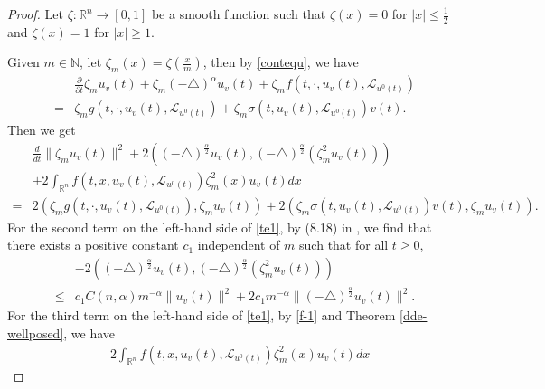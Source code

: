 \documentclass[11pt]{article}
\numberwithin{equation}{section}
\theoremstyle{plain}
\def\geq{\geqslant}
\def\leq{\leqslant}
\begin{document}
\begin{proof}
   Let $\zeta: \mathbb{R}^n \rightarrow [0,1]$ be a smooth function
   such that
   $\zeta(x)=0$ for $|x| \leq \frac{1}{2}$
   and $\zeta(x)=1$ for $|x| \geq 1$.

   Given $m \in \mathbb{N}$,
   let $\zeta_m(x) = \zeta( \frac{x}{m} )$,
   then by \eqref{contequ}, we have
\begin{align*}
        & \frac{\partial}{\partial t} \zeta_m u_v (t)
          + \zeta_m (-\triangle)^\alpha u_v (t)
          + \zeta_m f(t, \cdot, u_v(t), \mathcal{L}_{u^0(t)} )
            \nonumber \\
      = & \zeta_m g(t, \cdot, u_v(t), \mathcal{L}_{u^0(t)} )
          + \zeta_m \sigma(t, u_v (t), \mathcal{L}_{u^0(t)}) v(t).
\end{align*}
 Then  we get
\begin{align} \label{te1}
     & \frac{d}{dt} \| \zeta_m u_v(t) \|^2
        + 2
            \left( (-\triangle)^{\frac{\alpha}{2}} u_v(t),
                      (-\triangle)^{\frac{\alpha}{2}}
                                \left( \zeta_m^2 u_v(t) \right)
            \right)
             \nonumber \\
     & + 2 \int_{\mathbb{R}^n} f(t, x, u_v(t), \mathcal{L}_{u^0(t)} ) \zeta_m^2(x) u_v(t) dx
           \nonumber \\
   = & 2 \left( \zeta_m g(t, \cdot, u_v(t), \mathcal{L}_{u^0(t)} ), \zeta_m u_v(t) \right)
       + 2 \left( \zeta_m \sigma(t, u_v (t), \mathcal{L}_{u^0(t)}) v(t), \zeta_m u_v(t) \right).
\end{align}
 For the second term on the left-hand side of \eqref{te1},
 by (8.18) in \cite{wangbJDE2019},
 we find that there exists a positive constant $c_1$ independent of $m$ such that for all $t \geq 0$,
\begin{align} \label{te2}
       & - 2
            \left( (-\triangle)^{\frac{\alpha}{2}} u_v(t),
                      (-\triangle)^{\frac{\alpha}{2}}
                                \left( \zeta_m^2 u_v(t) \right)
            \right)
             \nonumber \\
  \leq & c_1 C(n,\alpha) m^{-\alpha} \| u_v(t) \|^2
         + 2 c_1 m^{-\alpha} \| (-\triangle)^{\frac{\alpha}{2}} u_v(t) \|^2.
\end{align}
 For the third term on the left-hand side of \eqref{te1},
 by \eqref{f-1} and Theorem \ref{dde-wellposed}, we have
\begin{align} \label{te3}
       & 2 \int_{\mathbb{R}^n} f(t, x, u_v(t), \mathcal{L}_{u^0(t)} ) \zeta_m^2(x) u_v(t) dx

\end{align}
\end{proof}
\end{document}
